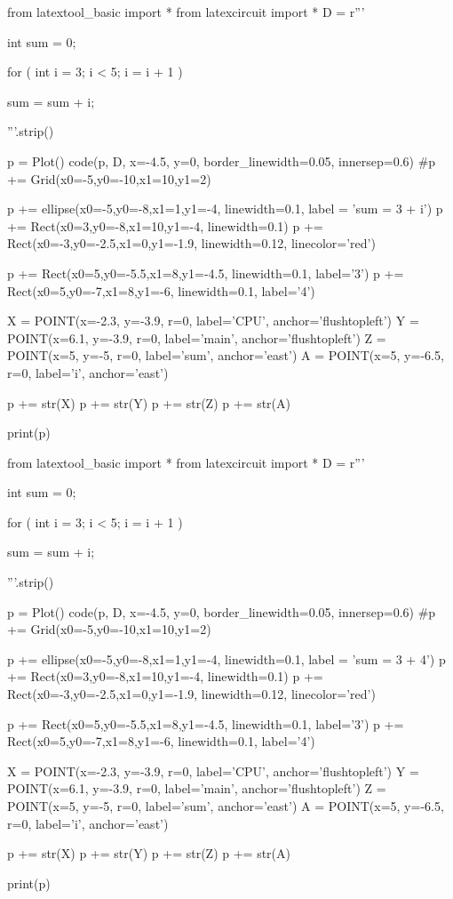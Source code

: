 \begin{python}
from latextool_basic import *
from latexcircuit import *
D = r'''



int sum = 0;

    for ( int i = 3;     i < 5;     i = i + 1 )


        sum = sum + i;



'''.strip()

p = Plot()
code(p, D, x=-4.5, y=0, border_linewidth=0.05, innersep=0.6)
#p += Grid(x0=-5,y0=-10,x1=10,y1=2)

p += ellipse(x0=-5,y0=-8,x1=1,y1=-4, linewidth=0.1, label = 'sum = 3 + i')
p += Rect(x0=3,y0=-8,x1=10,y1=-4, linewidth=0.1)
p += Rect(x0=-3,y0=-2.5,x1=0,y1=-1.9, linewidth=0.12, linecolor='red')

p += Rect(x0=5,y0=-5.5,x1=8,y1=-4.5, linewidth=0.1, label='3')
p += Rect(x0=5,y0=-7,x1=8,y1=-6, linewidth=0.1, label='4')

X = POINT(x=-2.3, y=-3.9, r=0, label='CPU', anchor='flushtopleft')
Y = POINT(x=6.1, y=-3.9, r=0, label='main', anchor='flushtopleft')
Z = POINT(x=5, y=-5, r=0, label='sum', anchor='east')
A = POINT(x=5, y=-6.5, r=0, label='i', anchor='east')

p += str(X)
p += str(Y)
p += str(Z)
p += str(A)

print(p)
\end{python}

\begin{python}
from latextool_basic import *
from latexcircuit import *
D = r'''



int sum = 0;

    for ( int i = 3;     i < 5;     i = i + 1 )


        sum = sum + i;



'''.strip()

p = Plot()
code(p, D, x=-4.5, y=0, border_linewidth=0.05, innersep=0.6)
#p += Grid(x0=-5,y0=-10,x1=10,y1=2)

p += ellipse(x0=-5,y0=-8,x1=1,y1=-4, linewidth=0.1, label = 'sum = 3 + 4')
p += Rect(x0=3,y0=-8,x1=10,y1=-4, linewidth=0.1)
p += Rect(x0=-3,y0=-2.5,x1=0,y1=-1.9, linewidth=0.12, linecolor='red')

p += Rect(x0=5,y0=-5.5,x1=8,y1=-4.5, linewidth=0.1, label='3')
p += Rect(x0=5,y0=-7,x1=8,y1=-6, linewidth=0.1, label='4')

X = POINT(x=-2.3, y=-3.9, r=0, label='CPU', anchor='flushtopleft')
Y = POINT(x=6.1, y=-3.9, r=0, label='main', anchor='flushtopleft')
Z = POINT(x=5, y=-5, r=0, label='sum', anchor='east')
A = POINT(x=5, y=-6.5, r=0, label='i', anchor='east')

p += str(X)
p += str(Y)
p += str(Z)
p += str(A)

print(p)
\end{python}

